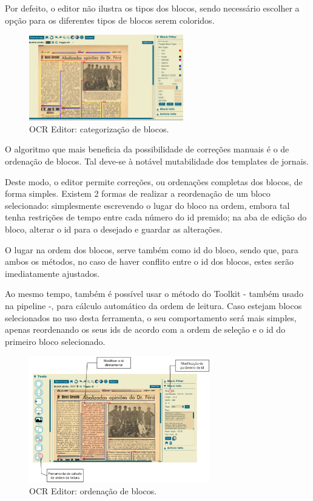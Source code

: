 Por defeito, o editor não ilustra os tipos dos blocos, sendo necessário escolher a opção para os diferentes tipos de blocos serem coloridos.

\begin{figure}[H]
	\centering
	\includegraphics[width=0.6\textwidth]{images/ilustracoes/ocr_editor_block_types.png}
	\caption{OCR Editor: categorização de blocos.}
	\label{fig:ocr_editor_block_types}
\end{figure}


O algoritmo que mais beneficia da possibilidade de correções manuais é o de ordenação de blocos. Tal deve-se à notável mutabilidade dos templates de jornais.

Deste modo, o editor permite correções, ou ordenações completas dos blocos, de forma simples. Existem 2 formas de realizar a reordenação de um bloco selecionado: simplesmente escrevendo o lugar do bloco na ordem, embora tal tenha restrições de tempo entre cada número do id premido; na aba de edição do bloco, alterar o id para o desejado e guardar as alterações.


O lugar na ordem dos blocos, serve também como id do bloco, sendo que, para ambos os métodos, no caso de haver conflito entre o id dos blocos, estes serão imediatamente ajustados.

Ao mesmo tempo, também é possível usar o método do Toolkit - também usado na pipeline -, para cálculo automático da ordem de leitura. Caso estejam blocos selecionados no uso desta ferramenta, o seu comportamento será mais simples, apenas reordenando os seus ids de acordo com a ordem de seleção e o id do primeiro bloco selecionado.


\begin{figure}[H]
	\centering
	\includegraphics[width=0.7\textwidth]{images/ilustracoes/ocr_editor_change_block_id.png}
	\caption{OCR Editor: ordenação de blocos.}
	\label{fig:ocr_editor_change_block_id}
\end{figure}


